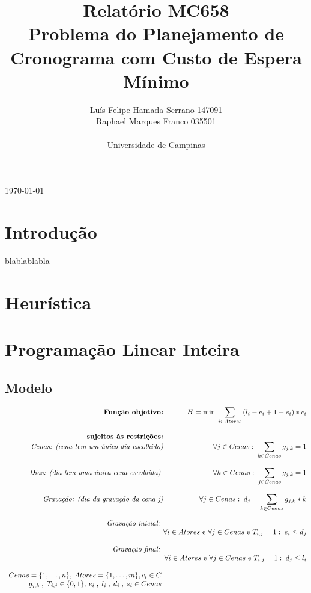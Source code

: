 \documentclass[12pt]{article}
\title{\textbf{Relatório MC658\\\large Problema do Planejamento de Cronograma com Custo de Espera Mínimo}}
\author{Luís Felipe Hamada Serrano 147091\\Raphael Marques Franco 035501\\\\ Universidade de Campinas}
\begin{document}
\maketitle 
\today{}
%
%

\newpage
\tableofcontents
\newpage

\section{Introdução}

blablablabla

\newpage
\section{Heurística}

\newpage
\section{Programação Linear Inteira}
\subsection{Modelo}
\[
	\begin{array}{r@{}r@{}r@{}l}
    \textbf{Função objetivo:}&\qquad 
	H =\text{min}\; \displaystyle\sum_{i\in Atores} {(l_i - e_i+1- s_i)*c_i}\\\\
    \textbf{sujeitos às restrições:}\\ 
   \textit{Cenas: (cena tem um único dia escolhido)} &\forall j \in Cenas: \;\displaystyle\sum_{k \in Cenas} {g_{j,k} = 1} & \\\\
   \textit{Dias: (dia tem uma única cena escolhida) }&\forall k \in Cenas: \;\displaystyle\sum_{j \in Cenas} {g_{j,k} = 1} & \\\\
\textit{Gravação: (dia da gravação da cena j)}&\forall j \in Cenas:\; d_j=\displaystyle\sum_{k \in Cenas} {g_{j,k}*k} & \\\\
\textit{Gravação inicial: }\\&\forall i \in Atores\text{ e }\forall  j\in Cenas \text{ e } T_{i,j} = 1:\; e_i \leq d_j & \\\\ 
\textit{Gravação final: }\\&\forall i \in Atores\text{ e }\forall  j\in Cenas \text{ e } T_{i,j} = 1:\; d_j \leq l_i & \\\\      
Cenas = \{1, \dots ,n\} ,\:
Atores = \{1, \dots ,m\} ,c_i \in C\:
&\\
g_{j,k}\;,\; T_{i,j} \in \{0,1\},\:e_i \;,\; l_i\;,\; d_i\;,\; s_i \in Cenas \:
&\\
    	\end{array}
\] 
\end{document}
